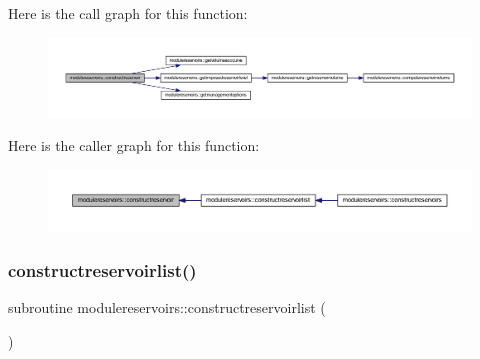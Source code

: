 Here is the call graph for this function\+:\nopagebreak
\begin{figure}[H]
\begin{center}
\leavevmode
\includegraphics[width=350pt]{namespacemodulereservoirs_adb0f83f2d398504e99ff31c83a07ff2b_cgraph}
\end{center}
\end{figure}
Here is the caller graph for this function\+:\nopagebreak
\begin{figure}[H]
\begin{center}
\leavevmode
\includegraphics[width=350pt]{namespacemodulereservoirs_adb0f83f2d398504e99ff31c83a07ff2b_icgraph}
\end{center}
\end{figure}
\mbox{\label{namespacemodulereservoirs_ac7bcb5beebaa4c557e558719e9656911}} 
\subsubsection{\texorpdfstring{constructreservoirlist()}{constructreservoirlist()}}
{\footnotesize\ttfamily subroutine modulereservoirs\+::constructreservoirlist (\begin{DoxyParamCaption}{ }\end{DoxyParamCaption})\hspace{0.3cm}{\ttfamily [private]}}

